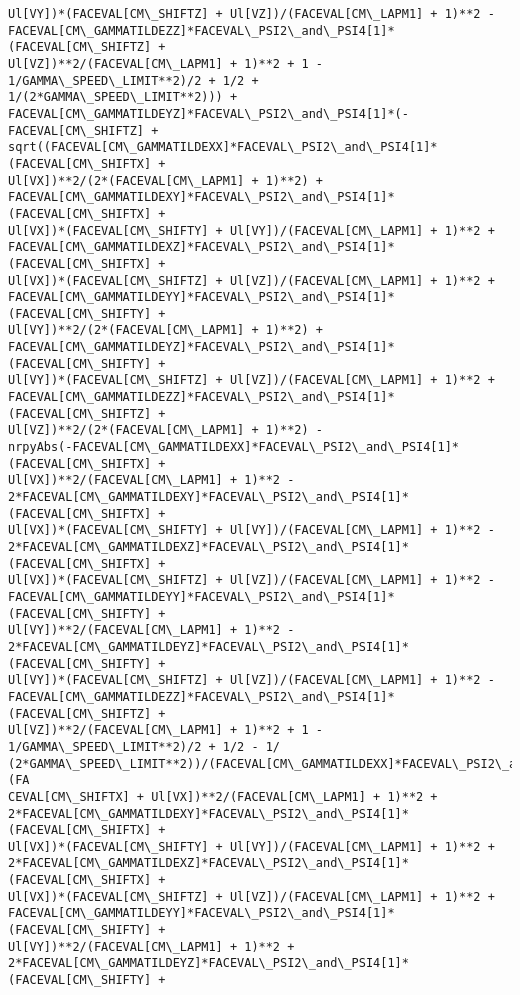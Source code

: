 \documentclass[landscape,letterpaper,10pt,english]{article}
\begin{document}
\begin{Verbatim}[commandchars=\\\{\}]
Ul[VY])*(FACEVAL[CM\_SHIFTZ] + Ul[VZ])/(FACEVAL[CM\_LAPM1] + 1)**2 -
FACEVAL[CM\_GAMMATILDEZZ]*FACEVAL\_PSI2\_and\_PSI4[1]*(FACEVAL[CM\_SHIFTZ] +
Ul[VZ])**2/(FACEVAL[CM\_LAPM1] + 1)**2 + 1 - 1/GAMMA\_SPEED\_LIMIT**2)/2 + 1/2 +
1/(2*GAMMA\_SPEED\_LIMIT**2))) +
FACEVAL[CM\_GAMMATILDEYZ]*FACEVAL\_PSI2\_and\_PSI4[1]*(-FACEVAL[CM\_SHIFTZ] +
sqrt((FACEVAL[CM\_GAMMATILDEXX]*FACEVAL\_PSI2\_and\_PSI4[1]*(FACEVAL[CM\_SHIFTX] +
Ul[VX])**2/(2*(FACEVAL[CM\_LAPM1] + 1)**2) +
FACEVAL[CM\_GAMMATILDEXY]*FACEVAL\_PSI2\_and\_PSI4[1]*(FACEVAL[CM\_SHIFTX] +
Ul[VX])*(FACEVAL[CM\_SHIFTY] + Ul[VY])/(FACEVAL[CM\_LAPM1] + 1)**2 +
FACEVAL[CM\_GAMMATILDEXZ]*FACEVAL\_PSI2\_and\_PSI4[1]*(FACEVAL[CM\_SHIFTX] +
Ul[VX])*(FACEVAL[CM\_SHIFTZ] + Ul[VZ])/(FACEVAL[CM\_LAPM1] + 1)**2 +
FACEVAL[CM\_GAMMATILDEYY]*FACEVAL\_PSI2\_and\_PSI4[1]*(FACEVAL[CM\_SHIFTY] +
Ul[VY])**2/(2*(FACEVAL[CM\_LAPM1] + 1)**2) +
FACEVAL[CM\_GAMMATILDEYZ]*FACEVAL\_PSI2\_and\_PSI4[1]*(FACEVAL[CM\_SHIFTY] +
Ul[VY])*(FACEVAL[CM\_SHIFTZ] + Ul[VZ])/(FACEVAL[CM\_LAPM1] + 1)**2 +
FACEVAL[CM\_GAMMATILDEZZ]*FACEVAL\_PSI2\_and\_PSI4[1]*(FACEVAL[CM\_SHIFTZ] +
Ul[VZ])**2/(2*(FACEVAL[CM\_LAPM1] + 1)**2) -
nrpyAbs(-FACEVAL[CM\_GAMMATILDEXX]*FACEVAL\_PSI2\_and\_PSI4[1]*(FACEVAL[CM\_SHIFTX] +
Ul[VX])**2/(FACEVAL[CM\_LAPM1] + 1)**2 -
2*FACEVAL[CM\_GAMMATILDEXY]*FACEVAL\_PSI2\_and\_PSI4[1]*(FACEVAL[CM\_SHIFTX] +
Ul[VX])*(FACEVAL[CM\_SHIFTY] + Ul[VY])/(FACEVAL[CM\_LAPM1] + 1)**2 -
2*FACEVAL[CM\_GAMMATILDEXZ]*FACEVAL\_PSI2\_and\_PSI4[1]*(FACEVAL[CM\_SHIFTX] +
Ul[VX])*(FACEVAL[CM\_SHIFTZ] + Ul[VZ])/(FACEVAL[CM\_LAPM1] + 1)**2 -
FACEVAL[CM\_GAMMATILDEYY]*FACEVAL\_PSI2\_and\_PSI4[1]*(FACEVAL[CM\_SHIFTY] +
Ul[VY])**2/(FACEVAL[CM\_LAPM1] + 1)**2 -
2*FACEVAL[CM\_GAMMATILDEYZ]*FACEVAL\_PSI2\_and\_PSI4[1]*(FACEVAL[CM\_SHIFTY] +
Ul[VY])*(FACEVAL[CM\_SHIFTZ] + Ul[VZ])/(FACEVAL[CM\_LAPM1] + 1)**2 -
FACEVAL[CM\_GAMMATILDEZZ]*FACEVAL\_PSI2\_and\_PSI4[1]*(FACEVAL[CM\_SHIFTZ] +
Ul[VZ])**2/(FACEVAL[CM\_LAPM1] + 1)**2 + 1 - 1/GAMMA\_SPEED\_LIMIT**2)/2 + 1/2 - 1/
(2*GAMMA\_SPEED\_LIMIT**2))/(FACEVAL[CM\_GAMMATILDEXX]*FACEVAL\_PSI2\_and\_PSI4[1]*(FA
CEVAL[CM\_SHIFTX] + Ul[VX])**2/(FACEVAL[CM\_LAPM1] + 1)**2 +
2*FACEVAL[CM\_GAMMATILDEXY]*FACEVAL\_PSI2\_and\_PSI4[1]*(FACEVAL[CM\_SHIFTX] +
Ul[VX])*(FACEVAL[CM\_SHIFTY] + Ul[VY])/(FACEVAL[CM\_LAPM1] + 1)**2 +
2*FACEVAL[CM\_GAMMATILDEXZ]*FACEVAL\_PSI2\_and\_PSI4[1]*(FACEVAL[CM\_SHIFTX] +
Ul[VX])*(FACEVAL[CM\_SHIFTZ] + Ul[VZ])/(FACEVAL[CM\_LAPM1] + 1)**2 +
FACEVAL[CM\_GAMMATILDEYY]*FACEVAL\_PSI2\_and\_PSI4[1]*(FACEVAL[CM\_SHIFTY] +
Ul[VY])**2/(FACEVAL[CM\_LAPM1] + 1)**2 +
2*FACEVAL[CM\_GAMMATILDEYZ]*FACEVAL\_PSI2\_and\_PSI4[1]*(FACEVAL[CM\_SHIFTY] +

\end{Verbatim}
\end{document}
